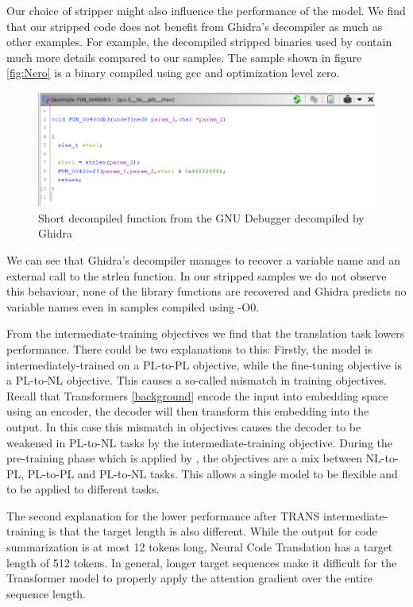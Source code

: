 Our choice of stripper might also influence the performance of the model. We find that our stripped code does not benefit from Ghidra's decompiler as much as other examples. For example, the decompiled stripped binaries used by \citeauthor{Nero} contain much more details compared to our samples. The sample shown in figure \ref{fig:Nero} is a binary compiled using gcc and optimization level zero.

\label{fig:Nero}
\begin{figure}[H]
  \centering
  \includegraphics[width=\linewidth]{img/Nero.png}
  \caption{Short decompiled function from the GNU Debugger \cite{Nero} decompiled by Ghidra}
\end{figure}

We can see that Ghidra's decompiler manages to recover a variable name and an external call to the strlen function. In our stripped samples we do not observe this behaviour, none of the library functions are recovered and Ghidra predicts no variable names even in samples compiled using -O0.

From the intermediate-training objectives we find that the translation task lowers performance. There could be two explanations to this: Firstly, the model is intermediately-trained on a PL-to-PL objective, while the fine-tuning objective is a PL-to-NL objective. This causes a so-called mismatch in training objectives. Recall that Transformers \ref{background} encode the input into embedding space using an encoder, the decoder will then transform this embedding into the output. In this case this mismatch in objectives causes the decoder to be weakened in PL-to-NL tasks by the intermediate-training objective. During the pre-training phase which is applied by \citeauthor{CodeT5}, the objectives are a mix between NL-to-PL, PL-to-PL and PL-to-NL tasks. This allows a single model to be flexible and to be applied to different tasks.

The second explanation for the lower performance after TRANS intermediate-training is that the target length is also different. While the output for code summarization is at most 12 tokens long, Neural Code Translation has a target length of 512 tokens. In general, longer target sequences make it difficult for the Transformer model to properly apply the attention gradient over the entire sequence length.

